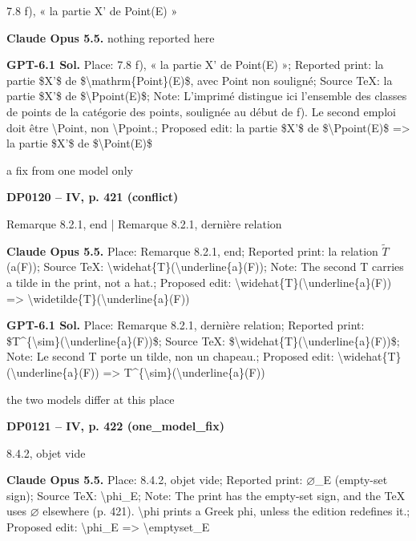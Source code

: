 7.8 f), « la partie X' de Point(E) »\par
\textbf{Claude Opus 5.5.} nothing reported here\par
\textbf{GPT-6.1 Sol.} Place: 7.8 f), « la partie X' de Point(E) »; Reported print: la partie \$X'\$ de \$\textbackslash{}mathrm\{Point\}(E)\$, avec Point non souligné; Source TeX: la partie \$X'\$ de \$\textbackslash{}Ppoint(E)\$; Note: L'imprimé distingue ici l'ensemble des classes de points de la catégorie des points, soulignée au début de f). Le second emploi doit être \textbackslash{}Point, non \textbackslash{}Ppoint.; Proposed edit: la partie \$X'\$ de \$\textbackslash{}Ppoint(E)\$ =\allowbreak > la partie \$X'\$ de \$\textbackslash{}Point(E)\$\par
a fix from one model only\par
\par\noindent\hypertarget{DP0120}{}\textbf{DP0120 -- IV, p. 421 (conflict)}\par
Remarque 8.2.1, end | Remarque 8.2.1, dernière relation\par
\textbf{Claude Opus 5.5.} Place: Remarque 8.2.1, end; Reported print: la relation \ensuremath{\tilde{T}}(a(F)); Source TeX: \textbackslash{}widehat\{T\}(\textbackslash{}underline\{a\}(F)); Note: The second T carries a tilde in the print, not a hat.; Proposed edit: \textbackslash{}widehat\{T\}(\textbackslash{}underline\{a\}(F)) =\allowbreak > \textbackslash{}widetilde\{T\}(\textbackslash{}underline\{a\}(F))\par
\textbf{GPT-6.1 Sol.} Place: Remarque 8.2.1, dernière relation; Reported print: \$T\textasciicircum{}\{\textbackslash{}sim\}(\textbackslash{}underline\{a\}(F))\$; Source TeX: \$\textbackslash{}widehat\{T\}(\textbackslash{}underline\{a\}(F))\$; Note: Le second T porte un tilde, non un chapeau.; Proposed edit: \textbackslash{}widehat\{T\}(\textbackslash{}underline\{a\}(F)) =\allowbreak > T\textasciicircum{}\{\textbackslash{}sim\}(\textbackslash{}underline\{a\}(F))\par
the two models differ at this place\par
\par\noindent\hypertarget{DP0121}{}\textbf{DP0121 -- IV, p. 422 (one\_model\_fix)}\par
8.4.2, objet vide\par
\textbf{Claude Opus 5.5.} Place: 8.4.2, objet vide; Reported print: \ensuremath{\varnothing}\_E (empty-set sign); Source TeX: \textbackslash{}phi\_E; Note: The print has the empty-set sign, and the TeX uses \ensuremath{\varnothing} elsewhere (p. 421). \textbackslash{}phi prints a Greek phi, unless the edition redefines it.; Proposed edit: \textbackslash{}phi\_E =\allowbreak > \textbackslash{}emptyset\_E\par
